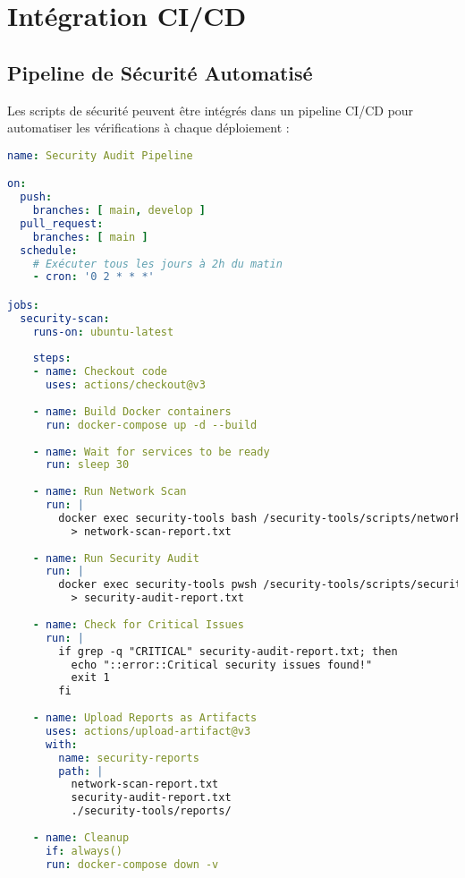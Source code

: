 \section{Intégration CI/CD}

\subsection{Pipeline de Sécurité Automatisé}

Les scripts de sécurité peuvent être intégrés dans un pipeline CI/CD pour automatiser les vérifications à chaque déploiement :

\begin{lstlisting}[language=YAML, caption=Exemple GitHub Actions Workflow, basicstyle=\ttfamily\tiny]
name: Security Audit Pipeline

on:
  push:
    branches: [ main, develop ]
  pull_request:
    branches: [ main ]
  schedule:
    # Exécuter tous les jours à 2h du matin
    - cron: '0 2 * * *'

jobs:
  security-scan:
    runs-on: ubuntu-latest
    
    steps:
    - name: Checkout code
      uses: actions/checkout@v3
    
    - name: Build Docker containers
      run: docker-compose up -d --build
    
    - name: Wait for services to be ready
      run: sleep 30
    
    - name: Run Network Scan
      run: |
        docker exec security-tools bash /security-tools/scripts/network-scan.sh \
          > network-scan-report.txt
    
    - name: Run Security Audit
      run: |
        docker exec security-tools pwsh /security-tools/scripts/security-audit.ps1 \
          > security-audit-report.txt
    
    - name: Check for Critical Issues
      run: |
        if grep -q "CRITICAL" security-audit-report.txt; then
          echo "::error::Critical security issues found!"
          exit 1
        fi
    
    - name: Upload Reports as Artifacts
      uses: actions/upload-artifact@v3
      with:
        name: security-reports
        path: |
          network-scan-report.txt
          security-audit-report.txt
          ./security-tools/reports/
    
    - name: Cleanup
      if: always()
      run: docker-compose down -v
\end{lstlisting}


